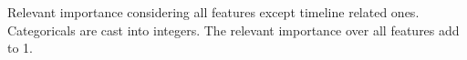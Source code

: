 Relevant importance considering all features except timeline related ones. Categoricals are cast into integers. The relevant importance over all features add to 1.